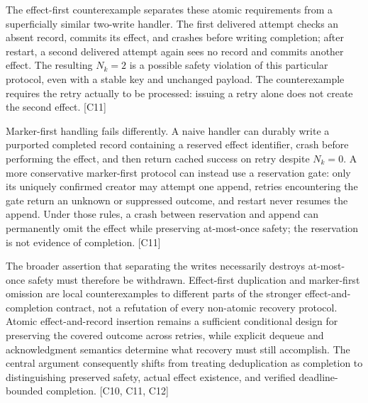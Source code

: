 \documentclass[11pt]{article}
\begin{document}
The effect-first counterexample separates these atomic requirements from a superficially similar two-write handler. The first delivered attempt checks an absent record, commits its effect, and crashes before writing completion; after restart, a second delivered attempt again sees no record and commits another effect. The resulting $N_k=2$ is a possible safety violation of this particular protocol, even with a stable key and unchanged payload. The counterexample requires the retry actually to be processed: issuing a retry alone does not create the second effect. [C11]

Marker-first handling fails differently. A naive handler can durably write a purported completed record containing a reserved effect identifier, crash before performing the effect, and then return cached success on retry despite $N_k=0$. A more conservative marker-first protocol can instead use a reservation gate: only its uniquely confirmed creator may attempt one append, retries encountering the gate return an unknown or suppressed outcome, and restart never resumes the append. Under those rules, a crash between reservation and append can permanently omit the effect while preserving at-most-once safety; the reservation is not evidence of completion. [C11]

The broader assertion that separating the writes necessarily destroys at-most-once safety must therefore be withdrawn. Effect-first duplication and marker-first omission are local counterexamples to different parts of the stronger effect-and-completion contract, not a refutation of every non-atomic recovery protocol. Atomic effect-and-record insertion remains a sufficient conditional design for preserving the covered outcome across retries, while explicit dequeue and acknowledgment semantics determine what recovery must still accomplish. The central argument consequently shifts from treating deduplication as completion to distinguishing preserved safety, actual effect existence, and verified deadline-bounded completion. [C10, C11, C12]
\end{document}
